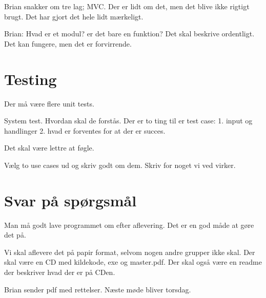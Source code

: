 \documentclass{article}
\begin{document}
Brian snakker om tre lag; MVC. Der er lidt om det, men det blive ikke rigtigt brugt. Det har gjort det hele lidt mærkeligt.

Brian: Hvad er et modul? er det bare en funktion? Det skal beskrive ordentligt. Det kan fungere, men det er forvirrende.

\section{Testing}
Der må være flere unit tests.

System test. Hvordan skal de forstås. Der er to ting til er test case: 1. input og handlinger 2. hvad er forventes for at der er succes.

Det skal være lettre at føgle.

Vælg to use cases ud og skriv godt om dem. Skriv for noget vi ved virker.

\section{Svar på spørgsmål}
Man må godt lave programmet om efter aflevering. Det er en god måde at gøre det på.

Vi skal aflevere det på papir format, selvom nogen andre grupper ikke skal. Der skal være en CD med kildekode, exe og master.pdf. Der skal også være en readme der beskriver hvad der er  på CDen.

Brian sender pdf med rettelser. Næste møde bliver torsdag.
\end{document}
